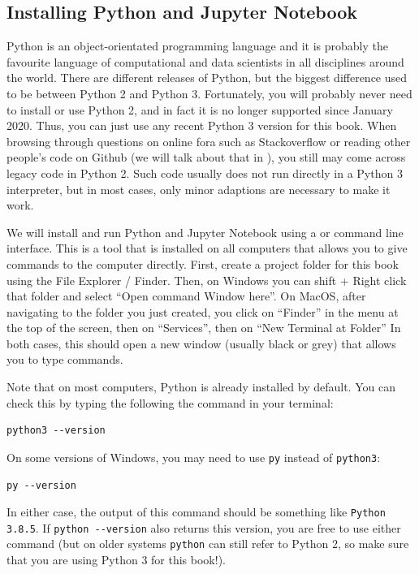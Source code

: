\subsection{Installing Python and Jupyter Notebook}

Python is an object-orientated programming language
and it is probably the favourite language of computational and data
scientists in all disciplines around the world.
There are different releases of Python, but the biggest difference used to be between Python 2 and Python 3.
Fortunately, you will probably never need to install or use Python 2, and in fact it is no longer supported since January 2020.
Thus, you can just use any recent Python 3 version for this book.
When browsing through questions on online fora such as Stackoverflow or reading other people's code on Github (we will talk about that in ), you still may come across legacy code in Python 2. Such code usually does not run directly in a Python 3 interpreter, but in most cases, only minor adaptions are necessary to make it work.

We will install and run Python and Jupyter Notebook using a  or command line interface.
This is a tool that is installed on all computers that allows you to give commands to the computer directly.
First, create a project folder for this book using the File Explorer / Finder.
Then, on Windows you can shift + Right click that folder and select ``Open command Window here''.
On MacOS, after navigating to the folder you just created, you click on ``Finder'' in the menu at the top of the screen, then on ``Services'', then on ``New Terminal at Folder''
In both cases, this should open a new window (usually black or grey) that allows you to type commands.

Note that on most computers, Python is already installed by default.
You can check this by typing the following the command in your terminal:

\begin{verbatim}
python3 --version
\end{verbatim}

On some versions of Windows, you may need to use \verb|py| instead of \verb|python3|:
\begin{verbatim}
py --version
\end{verbatim}

In either case, the output of this command should be something like \verb|Python 3.8.5|.
If \verb|python --version| also returns this version, you are free to use either command
(but on older systems \verb|python| can still refer to Python 2, so make sure that you are using Python 3 for this book!).


